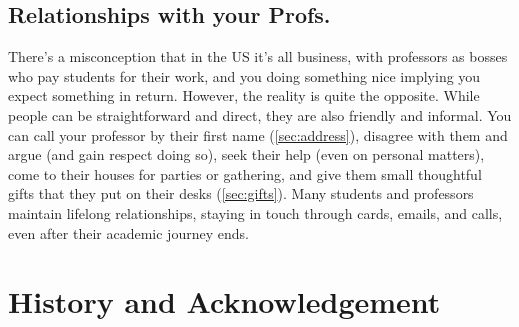 \documentclass[oneside,11pt]{memoir}
\newenvironment{commentbox}[1][]{
  \small
  \begin{mybox}
    {\small \textbf{#1}}
  }{
  \end{mybox}
}
\begin{document}
\section{Relationships with your Profs.}
There's a misconception that in the US it's all business, with professors as bosses who pay students for their work, and you doing something nice implying you expect something in return. However, the reality is quite the opposite. While people can be straightforward and direct, they are also friendly and informal. You can call your professor by their first name (\autoref{sec:address}), disagree with them and argue (and gain respect doing so), seek their help (even on personal matters), come to their houses for parties or gathering, and give them small thoughtful gifts that they put on their desks (\autoref{sec:gifts}).  Many students and professors maintain lifelong relationships, staying in touch through cards, emails, and calls, even after their academic journey ends. %






\chapter{History and Acknowledgement}\label{sec:ack}
\end{document}
